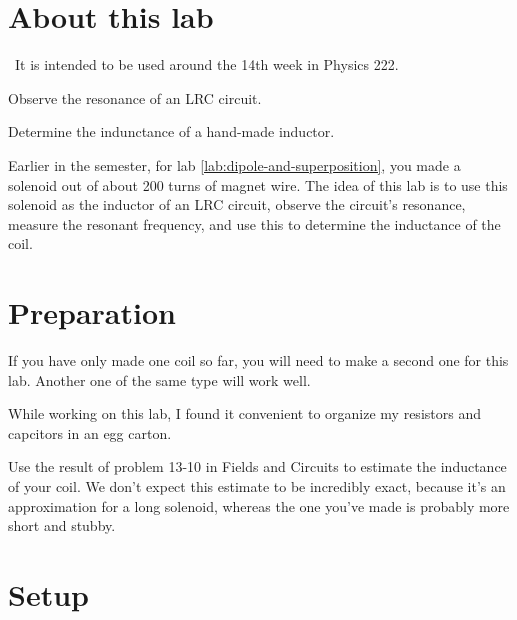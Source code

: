\renewcommand\thechapter{c2.14a}
\label{lab:ac-circuits}

\section*{About this lab}

\covid\ 
It is intended to be used around the 14th week in Physics 222.

\apparatus
{}

\begin{goals}

\item[] Observe the resonance of an LRC circuit.

\item[] Determine the indunctance of a hand-made inductor.
\end{goals}

\introduction

Earlier in the semester, for lab \ref{lab:dipole-and-superposition}, you 
made a solenoid out of about 200 turns of magnet wire. The idea of this
lab is to use this solenoid as the inductor of an LRC circuit, observe
the circuit's resonance, measure the resonant frequency, and use this
to determine the inductance of the coil.

\section*{Preparation}

If you have only made one coil so far, you will need to make a second one
for this lab. Another one of the same type will work well.

While working on this lab, I found it convenient to organize my resistors
and capcitors in an egg carton.

Use the result of problem 13-10 in Fields and Circuits to estimate the
inductance of your coil. We don't expect this estimate to be incredibly
exact, because it's an approximation for a long solenoid, whereas the
one you've made is probably more short and stubby.

\section*{Setup}

